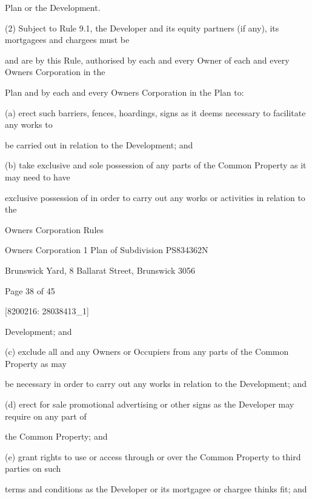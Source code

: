 \documentclass{article}
\begin{document}
{\fontsize{10.02}{1}Plan or the Development. }

{\fontsize{9.962}{1}(2) Subject to Rule 9.1, the Developer and its equity partners (if any), its mortgagees and chargees must be }

{\fontsize{10.02}{1}and are by this Rule, authorised by each and every Owner of each and every Owners Corporation in the }

{\fontsize{10.02}{1}Plan and by each and every Owners Corporation in the Plan to: }

{\fontsize{9.962}{1}(a) erect such barriers, fences, hoardings, signs as it deems necessary to facilitate any works to }

{\fontsize{10.02}{1}be carried out in relation to the Development; and }

{\fontsize{9.962}{1}(b) take exclusive and sole possession of any parts of the Common Property as it may need to have }

{\fontsize{10.02}{1}exclusive possession of in order to carry out any works or activities in relation to the }

\newpage





{\fontsize{9}{1}Owners Corporation Rules }

{\fontsize{9}{1}Owners Corporation 1 Plan of Subdivision PS834362N }

{\fontsize{9}{1}Brunswick Yard, 8 Ballarat Street, Brunswick 3056 }


{\fontsize{9}{1}Page 38  of 45 }



{\fontsize{7.02}{1}[8200216: 28038413\_1] }

{\fontsize{10.02}{1}Development; and }

{\fontsize{9.962}{1}(c) exclude all and any Owners or Occupiers from any parts of the Common Property as may }


{\fontsize{10.02}{1}be necessary in order to carry out any works in relation to the Development; and }

{\fontsize{9.962}{1}(d) erect for sale promotional advertising or other signs as the Developer may require on any part of }

{\fontsize{10.02}{1}the Common Property; and }

{\fontsize{9.962}{1}(e) grant rights to use or access through or over the Common Property to third parties on such }

{\fontsize{10.02}{1}terms and conditions as the Developer or its mortgagee or chargee thinks fit; and }
\end{document}
